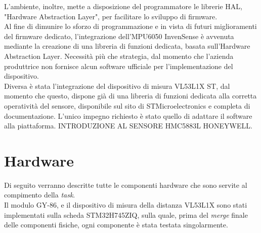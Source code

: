 \documentclass[11pt]{report}
\begin{document}
L'ambiente, inoltre, mette a disposizione del programmatore le librerie HAL, "Hardware Abstraction Layer", per facilitare lo sviluppo di firmware.\\
Al fine di dimunire lo sforzo di programmazione e in vista di futuri miglioramenti del firmware dedicato, l'integrazione dell'MPU6050 InvenSense è avvenuta mediante la creazione di una libreria di funzioni dedicata, basata sull'Hardware Abstraction Layer. Necessità più che strategia, dal momento che l'azienda produttrice non fornisce alcun software ufficiale per l'implementazione del dispositivo.\\
Diversa è stata l'integrazione del dispositivo di misura VL53L1X ST, dal momento che questo, dispone già di una libreria di funzioni dedicata alla corretta operatività del sensore, disponibile sul sito di STMicroelectronics e completa di documentazione. 
L'unico impegno richiesto è stato quello di adattare il software alla piattaforma.
INTRODUZIONE AL SENSORE HMC5883L HONEYWELL. 
\newpage
\chapter{Hardware}
\label{Hardware}
Di seguito verranno descritte tutte le componenti hardware che sono servite al compimento della \textit{task}.\\
Il modulo GY-86, e il dispositivo di misura della distanza VL53L1X sono stati implementati sulla scheda STM32H745ZIQ, sulla quale, prima del \textit{merge} finale delle componenti fisiche, ogni componente è stata testata singolarmente.
\end{document}
